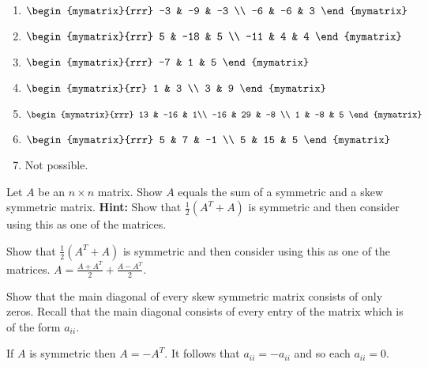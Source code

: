 \begin{enumialphparenastyle}
\begin{ex}
\begin{sol}
\begin{enumerate}
\item $\begin{mymatrix}{rrr}
-3 & -9 & -3 \\
-6 & -6 & 3
\end{mymatrix}$
\item $\begin{mymatrix}{rrr}
5 & -18 & 5 \\
-11 & 4 & 4
\end{mymatrix}$
\item $\begin{mymatrix}{rrr}
-7 & 1 & 5
\end{mymatrix}$
\item $\begin{mymatrix}{rr}
1 & 3 \\
3 & 9
\end{mymatrix}$
\item $\begin{mymatrix}{rrr}
13 & -16 & 1\\
-16 & 29 & -8 \\
1 & -8 & 5
\end{mymatrix}$
\item $\begin{mymatrix}{rrr}
5 & 7 & -1 \\
5 & 15 & 5 
\end{mymatrix}$
\item Not possible.
\end{enumerate}
\end{sol}
\end{ex}

\begin{ex} Let $A$ be an $n\times n$ matrix. Show $A$ equals the sum of a
symmetric and a skew symmetric matrix.  
\textbf{Hint: }Show that $
\frac{1}{2}\left( A^{T}+A\right) $ is symmetric and then consider using this
as one of the matrices. 
\begin{sol}
Show that $\frac{1}{2}\left( A^{T}+A\right) $ is symmetric and then consider using this
as one of the matrices. $A=\frac{A+A^{T}}{2}+\frac{A-A^{T}}{2}.$
\end{sol}
\end{ex}

\begin{ex} Show that the main diagonal of every skew symmetric matrix consists of only zeros. Recall that the main diagonal consists of every entry of the matrix which is of the form
$a_{ii}$. 
\begin{sol}
If $A$ is symmetric then $A=-A^{T}.$ It follows that $a_{ii}=-a_{ii}$ and so each $a_{ii}=0$.
\end{sol}
\end{ex}


\end{enumialphparenastyle}
